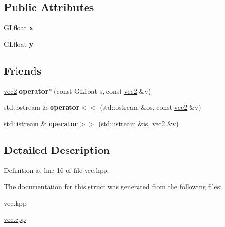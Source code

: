 \subsection*{Public Attributes}
\begin{DoxyCompactItemize}
\item 
\hypertarget{struct_angel_1_1vec2_ab99b91871c08bbf76bf4a5e554ccac8f}{G\-Lfloat {\bfseries x}}\label{struct_angel_1_1vec2_ab99b91871c08bbf76bf4a5e554ccac8f}

\item 
\hypertarget{struct_angel_1_1vec2_a9f0e4c33e7884eca47d771ccfd4ea0bd}{G\-Lfloat {\bfseries y}}\label{struct_angel_1_1vec2_a9f0e4c33e7884eca47d771ccfd4ea0bd}

\end{DoxyCompactItemize}
\subsection*{Friends}
\begin{DoxyCompactItemize}
\item 
\hypertarget{struct_angel_1_1vec2_a1f371c4b26f86deb4d296dfff8ff1fc1}{\hyperlink{struct_angel_1_1vec2}{vec2} {\bfseries operator$\ast$} (const G\-Lfloat s, const \hyperlink{struct_angel_1_1vec2}{vec2} \&v)}\label{struct_angel_1_1vec2_a1f371c4b26f86deb4d296dfff8ff1fc1}

\item 
\hypertarget{struct_angel_1_1vec2_a5533e582fe94db90861caa394494f2cf}{std\-::ostream \& {\bfseries operator$<$$<$} (std\-::ostream \&os, const \hyperlink{struct_angel_1_1vec2}{vec2} \&v)}\label{struct_angel_1_1vec2_a5533e582fe94db90861caa394494f2cf}

\item 
\hypertarget{struct_angel_1_1vec2_af8cf130207f2cf5866ac13049e956c75}{std\-::istream \& {\bfseries operator$>$$>$} (std\-::istream \&is, \hyperlink{struct_angel_1_1vec2}{vec2} \&v)}\label{struct_angel_1_1vec2_af8cf130207f2cf5866ac13049e956c75}

\end{DoxyCompactItemize}


\subsection{Detailed Description}


Definition at line 16 of file vec.\-hpp.



The documentation for this struct was generated from the following files\-:\begin{DoxyCompactItemize}
\item 
vec.\-hpp\item 
\hyperlink{vec_8cpp}{vec.\-cpp}\end{DoxyCompactItemize}
